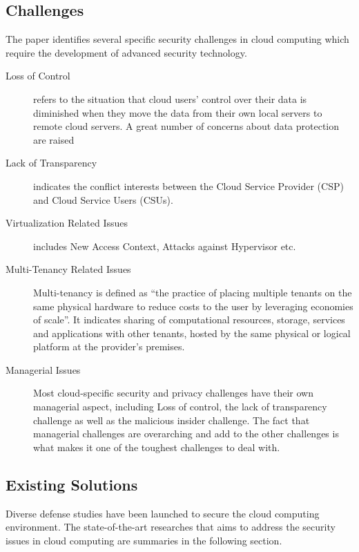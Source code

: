\documentclass[a4paper]{article}
\begin{document}
\subsection{Challenges}
The paper identifies several specific security challenges in cloud computing which require the development of advanced security technology.

\begin{description}
	\item [Loss of Control] refers to the situation that cloud users’ control over their data is diminished when they move the data from their own local servers to remote cloud servers. A great number of concerns about
	data protection are raised
	\item [Lack of Transparency] indicates the conflict interests between the Cloud Service Provider (CSP) and Cloud Service Users (CSUs).
	\item [Virtualization Related Issues] includes New Access Context, Attacks against Hypervisor etc.
	\item[Multi-Tenancy Related Issues] Multi-tenancy is defined as “the practice of placing multiple tenants on the same physical hardware to reduce costs to the user by leveraging economies of scale”\cite{brown2012multi}. It indicates sharing of computational resources, storage, services and applications with other tenants, hosted by the same physical or logical platform at the provider’s premises.
	\item [Managerial Issues] Most cloud-specific security and privacy challenges have their own managerial aspect, including Loss of control, the lack of transparency challenge as well as the malicious insider challenge. The fact that managerial challenges are overarching
	and add to the other challenges is what makes it one of the toughest challenges to deal with.
\end{description}

\subsection{Existing Solutions}
Diverse defense studies have been launched to secure the cloud computing environment. The state-of-the-art researches that aims to
address the security issues in cloud computing are summaries in the following section.
\end{document}
